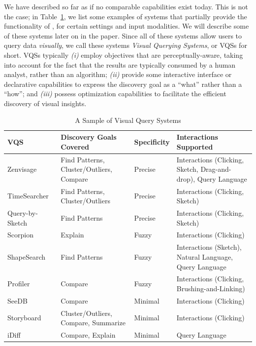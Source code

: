 \par
{}
We have described \vida so far as if no comparable capabilities
exist today.
This is not the case; in Table~\ref{fig:table}, we list some examples of systems
that partially provide the functionality of \vida,
for certain settings and input modalities.
We will describe some of these systems later on in the paper. 
Since all of these systems allow users to query data {\em visually},
we call these systems {\em Visual Querying Systems}, or VQSs for short.
VQSs typically {\em (i)} 
employ objectives that are perceptually-aware,
taking into account for the fact that the results are typically
consumed by a human analyst, rather than an algorithm;
{\em (ii)} provide some interactive interface or declarative capabilities
to express the discovery goal as a ``what'' rather than a ``how'';
and {\em (iii)} possess optimization capabilities to facilitate
the efficient discovery of visual insights. 


\begin{table}[!t]
\scriptsize
\centering
\begin{tabular}{l|l|l|p{7.5cm}}
VQS & Discovery Goals Covered & Specificity & Interactions Supported \\ \hline

Zenvisage~\cite{Lee2017,Siddiqui2016} & Find Patterns, Cluster/Outliers, Compare & Precise & Interactions (Clicking, Sketch, Drag-and-drop), Query Language \\
TimeSearcher~\cite{hochheiser2004dynamic} & Find Patterns, Cluster/Outliers & Precise & Interactions (Clicking, Sketch) \\ 
Query-by-Sketch~\cite{wattenberg2001sketching} & Find Patterns & Precise & Interactions (Clicking, Sketch) \\ 

Scorpion~\cite{Wu2013} & Explain & Fuzzy & Interactions (Clicking) \\

ShapeSearch~\cite{Siddiqui2018} & Find Patterns & Fuzzy & Interactions (Sketch), Natural Language, Query Language \\

Profiler~\cite{Kandel2012} & Compare & Fuzzy & Interactions (Clicking, Brushing-and-Linking) \\
SeeDB~\cite{Vartak2015} & Compare & Minimal & Interactions (Clicking) \\
Storyboard~\cite{Lee2018} & Cluster/Outliers, Compare, Summarize & Minimal & Interactions (Clicking) \\
iDiff~\cite{Sarawagi1998,Sarawagi2000} & Compare, Explain & Minimal & Query Language \\

\end{tabular}
\vspace{-10pt}
\caption{A Sample of Visual Query Systems}\label{fig:table}
\vspace{-10pt}
\end{table}


